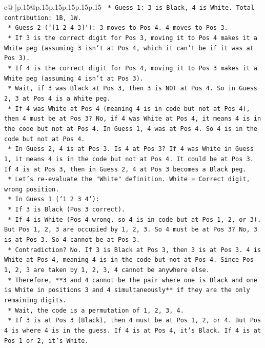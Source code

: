 \documentclass{article}
\begin{document}
{\begin{supertabular}{c@{$\;$}|p{.15\linewidth}@{}p{.15\linewidth}p{.15\linewidth}p{.15\linewidth}p{.15\linewidth}p{.15\linewidth}}
{{{\texttt{            *   Guess 1: 3 is Black, 4 is White. Total contribution: 1B, 1W.} \\
\texttt{            *   Guess 2 (`{[}1 2 4 3{]}`): 3 moves to Pos 4. 4 moves to Pos 3.} \\
\texttt{            *   If 3 is the correct digit for Pos 3, moving it to Pos 4 makes it a White peg (assuming 3 isn't at Pos 4, which it can't be if it was at Pos 3).} \\
\texttt{            *   If 4 is the correct digit for Pos 4, moving it to Pos 3 makes it a White peg (assuming 4 isn't at Pos 3).} \\
\texttt{            *   Wait, if 3 was Black at Pos 3, then 3 is NOT at Pos 4. So in Guess 2, 3 at Pos 4 is a White peg.} \\
\texttt{            *   If 4 was White at Pos 4 (meaning 4 is in code but not at Pos 4), then 4 must be at Pos 3? No, if 4 was White at Pos 4, it means 4 is in the code but not at Pos 4. In Guess 1, 4 was at Pos 4. So 4 is in the code but not at Pos 4.} \\
\texttt{            *   In Guess 2, 4 is at Pos 3. Is 4 at Pos 3? If 4 was White in Guess 1, it means 4 is in the code but not at Pos 4. It could be at Pos 3. If 4 is at Pos 3, then in Guess 2, 4 at Pos 3 becomes a Black peg.} \\
\texttt{            *   Let's re{-}evaluate the "White" definition. White = Correct digit, wrong position.} \\
\texttt{            *   In Guess 1 (`1 2 3 4`):} \\
\texttt{                *   If 3 is Black (Pos 3 correct).} \\
\texttt{                *   If 4 is White (Pos 4 wrong, so 4 is in code but at Pos 1, 2, or 3). But Pos 1, 2, 3 are occupied by 1, 2, 3. So 4 must be at Pos 3? No, 3 is at Pos 3. So 4 cannot be at Pos 3.} \\
\texttt{                *   Contradiction? No. If 3 is Black at Pos 3, then 3 is at Pos 3. 4 is White at Pos 4, meaning 4 is in the code but not at Pos 4. Since Pos 1, 2, 3 are taken by 1, 2, 3, 4 cannot be anywhere else.} \\
\texttt{                *   Therefore, **3 and 4 cannot be the pair where one is Black and one is White in positions 3 and 4 simultaneously** if they are the only remaining digits.} \\
\texttt{                *   Wait, the code is a permutation of 1, 2, 3, 4.} \\
\texttt{                *   If 3 is at Pos 3 (Black), then 4 must be at Pos 1, 2, or 4. But Pos 4 is where 4 is in the guess. If 4 is at Pos 4, it's Black. If 4 is at Pos 1 or 2, it's White.} \\
}}}
\end{supertabular}}
\end{document}
